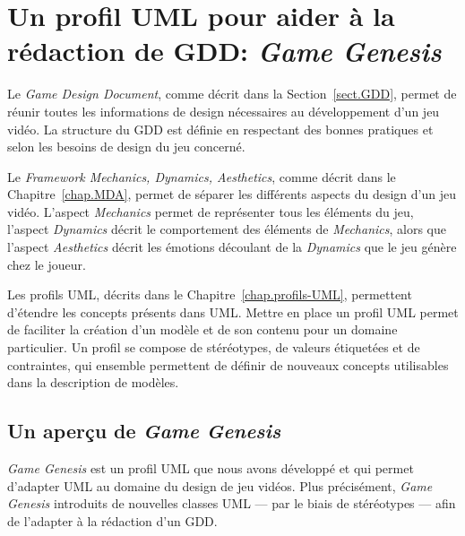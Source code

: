 \chapter{Un profil UML pour aider à la rédaction de GDD: \emph{Game Genesis}}
\label{game-genesis.sect}

Le \emph{Game Design Document}, comme décrit dans la Section~\ref{sect.GDD}, permet de réunir toutes les informations de design nécessaires au développement d'un jeu vidéo. La structure du GDD est définie en respectant des bonnes pratiques et selon les besoins de design du jeu concerné.



Le \emph{Framework Mechanics, Dynamics, Aesthetics}, comme décrit dans le Chapitre~\ref{chap.MDA}, permet de séparer les différents aspects du design d'un jeu vidéo. L'aspect \emph{Mechanics} permet de représenter tous les éléments du jeu, l'aspect \emph{Dynamics} décrit le comportement des \'el\'ements de \emph{Mechanics}, alors que l'aspect \emph{Aesthetics} d\'ecrit les émotions découlant de la \emph{Dynamics} que le jeu génère chez le joueur.

Les profils UML, décrits dans le Chapitre~\ref{chap.profils-UML}, permettent d'étendre les concepts présents dans UML. Mettre en place un profil UML permet de faciliter la cr\'eation d'un modèle et de son contenu pour un domaine particulier. Un profil se compose de stéréotypes, de valeurs étiquetées et de contraintes, qui ensemble permettent de d\'efinir de nouveaux concepts utilisables dans la description de modèles.


\section{Un aper\c{c}u de \emph{Game Genesis}}
\label{sect.gg_what}
\emph{Game Genesis} est un profil UML que nous avons d\'evelopp\'e et qui permet d'adapter UML au domaine du design de jeu vidéos. 
Plus précisément, \emph{Game Genesis} introduits de nouvelles classes UML --- par le biais de st\'er\'eotypes --- afin de l'adapter à la rédaction d'un GDD.



